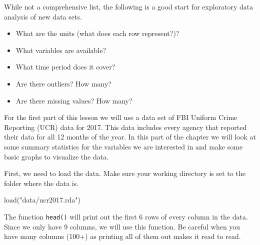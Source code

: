 \documentclass[
]{krantz}
\makeatletter
\newenvironment{Shaded}{\begin{snugshade}}{\end{snugshade}}
\newcommand{\FunctionTok}[1]{\textcolor[rgb]{0,0,0}{#1}}
\newcommand{\NormalTok}[1]{#1}
\newcommand{\StringTok}[1]{\textcolor[rgb]{0.5,0.5,0.5}{#1}}
\providecommand{\tightlist}{%
  \setlength{\itemsep}{0pt}\setlength{\parskip}{0pt}}
\newenvironment{kframe}{%
\medskip{}
\setlength{\fboxsep}{.8em}
 \def\at@end@of@kframe{}%
 \ifinner\ifhmode%
  \def\at@end@of@kframe{\end{minipage}}%
  \begin{minipage}{\columnwidth}%
 \fi\fi%
 \def\FrameCommand##1{\hskip\@totalleftmargin \hskip-\fboxsep
 \colorbox{shadecolor}{##1}\hskip-\fboxsep
     \hskip-\linewidth \hskip-\@totalleftmargin \hskip\columnwidth}%
 \MakeFramed {\advance\hsize-\width
   \@totalleftmargin\z@ \linewidth\hsize
   \@setminipage}}%
 {\par\unskip\endMakeFramed%
 \at@end@of@kframe}
\renewenvironment{Shaded}{\begin{kframe}}{\end{kframe}}
\makeatother
\begin{document}
While not a comprehensive list, the following is a good start for exploratory data analysis of new data sets.

\begin{itemize}
\tightlist
\item
  What are the units (what does each row represent?)?
\item
  What variables are available?
\item
  What time period does it cover?
\item
  Are there outliers? How many?
\item
  Are there missing values? How many?
\end{itemize}

For the first part of this lesson we will use a data set of FBI Uniform Crime Reporting (UCR) data for 2017. This data includes every agency that reported their data for all 12 months of the year. In this part of the chapter we will look at some summary statistics for the variables we are interested in and make some basic graphs to visualize the data.

First, we need to load the data. Make sure your working directory is set to the folder where the data is.

\begin{Shaded}
\begin{Highlighting}[]
\FunctionTok{load}\NormalTok{(}\StringTok{"data/ucr2017.rda"}\NormalTok{)}
\end{Highlighting}
\end{Shaded}

The function \texttt{head()} will print out the first 6 rows of every column in the data. Since we only have 9 columns, we will use this function. Be careful when you have many columns (100+) as printing all of them out makes it read to read.
\end{document}
